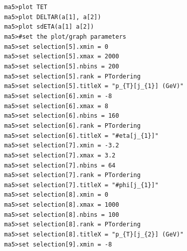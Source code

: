 \documentclass[a4paper, 10pt]{article}
\begin{document}
\texttt{ }\texttt{ }\texttt{ma5>plot TET\\
}
\texttt{ }\texttt{ }\texttt{ma5>plot DELTAR(a[1], a[2])\\
}
\texttt{ }\texttt{ }\texttt{ma5>plot sdETA(a[1] a[2])\\
}
\texttt{ }\texttt{ }\texttt{ma5>\#set the plot/\-graph parameters\\
}
\texttt{ }\texttt{ }\texttt{ma5>set selection[5].xmin = 0\\
}
\texttt{ }\texttt{ }\texttt{ma5>set selection[5].xmax = 2000\\
}
\texttt{ }\texttt{ }\texttt{ma5>set selection[5].nbins = 200\\
}
\texttt{ }\texttt{ }\texttt{ma5>set selection[5].rank = PTordering\\
}
\texttt{ }\texttt{ }\texttt{ma5>set selection[5].titleX = "p\_\{T\}[j\_\{1\}] (GeV)"\\
}
\texttt{ }\texttt{ }\texttt{ma5>set selection[6].xmin = -8\\
}
\texttt{ }\texttt{ }\texttt{ma5>set selection[6].xmax = 8\\
}
\texttt{ }\texttt{ }\texttt{ma5>set selection[6].nbins = 160\\
}
\texttt{ }\texttt{ }\texttt{ma5>set selection[6].rank = PTordering\\
}
\texttt{ }\texttt{ }\texttt{ma5>set selection[6].titleX = "\#eta[j\_\{1\}]"\\
}
\texttt{ }\texttt{ }\texttt{ma5>set selection[7].xmin = -3.2\\
}
\texttt{ }\texttt{ }\texttt{ma5>set selection[7].xmax = 3.2\\
}
\texttt{ }\texttt{ }\texttt{ma5>set selection[7].nbins = 64\\
}
\texttt{ }\texttt{ }\texttt{ma5>set selection[7].rank = PTordering\\
}
\texttt{ }\texttt{ }\texttt{ma5>set selection[7].titleX = "\#phi[j\_\{1\}]"\\
}
\texttt{ }\texttt{ }\texttt{ma5>set selection[8].xmin = 0\\
}
\texttt{ }\texttt{ }\texttt{ma5>set selection[8].xmax = 1000\\
}
\texttt{ }\texttt{ }\texttt{ma5>set selection[8].nbins = 100\\
}
\texttt{ }\texttt{ }\texttt{ma5>set selection[8].rank = PTordering\\
}
\texttt{ }\texttt{ }\texttt{ma5>set selection[8].titleX = "p\_\{T\}[j\_\{2\}] (GeV)"\\
}
\texttt{ }\texttt{ }\texttt{ma5>set selection[9].xmin = -8\\
}
\end{document}
